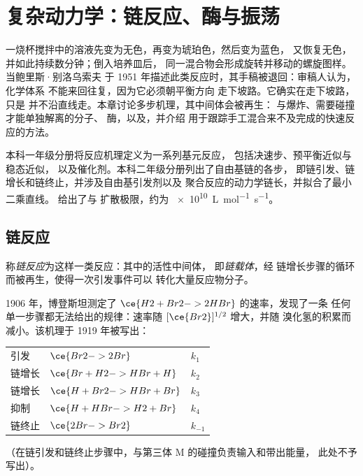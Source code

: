 \chapter{复杂动力学：链反应、酶与振荡}\label{ch:b3:complex-kinetics}

一烧杯搅拌中的溶液先变为无色，再变为琥珀色，然后变为蓝色，
又恢复无色，并如此持续数分钟；倒入培养皿后，
同一混合物会形成旋转并移动的螺旋图样。当鲍里斯·别洛乌索夫
于 1951 年描述此类反应时，其手稿被退回：审稿人认为，化学体系
不能来回往复，因为它必须朝平衡方向
走下坡路。它确实在走下坡路，只是
并不沿直线走。本章讨论多步机理，其中间体会被再生：
与爆炸、需要碰撞才能单独解离的分子、
酶，以及，并介绍
用于跟踪手工混合来不及完成的快速反应的方法。

\begin{recall}
本科一年级分册将反应机理定义为一系列基元反应，
包括决速步、预平衡近似与稳态近似，
以及催化剂。本科二年级分册列出了自由基链的各步，
即链引发、链增长和链终止，并涉及自由基引发剂以及
聚合反应的动力学链长，并拟合了最小二乘直线。
给出了与
扩散极限，约为 \qty{e10}{L.mol^{-1}.s^{-1}}。
\end{recall}

\section{链反应}

\begin{definition}\label{def:b3:complex-kinetics:chain}
称\emph{链反应}为这样一类反应：其中的活性中间体，
即\emph{链载体}，经
链增长步骤的循环而被再生，使得一次引发事件可以
转化大量反应物分子。
\end{definition}

1906 年，博登斯坦测定了 $\ce{H2 + Br2 -> 2 HBr}$ 的速率，发现了一条
任何单一步骤都无法给出的规律：速率随 $[\ce{Br2}]^{1/2}$ 增大，并随
溴化氢的积累而减小。该机理于 1919 年被写出：
\begin{center}
\begin{tabular}{lll}
引发 & $\ce{Br2 -> 2 Br}$ & $k_1$ \\
链增长 & $\ce{Br + H2 -> HBr + H}$ & $k_2$ \\
链增长 & $\ce{H + Br2 -> HBr + Br}$ & $k_3$ \\
抑制 & $\ce{H + HBr -> H2 + Br}$ & $k_4$ \\
链终止 & $\ce{2 Br -> Br2}$ & $k_{-1}$
\end{tabular}
\end{center}
（在链引发和链终止步骤中，与第三体 M 的碰撞负责输入和带出能量，
此处不予写出）。

